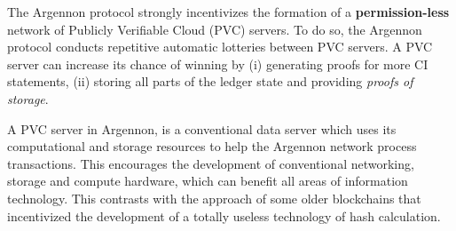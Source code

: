 The Argennon protocol strongly incentivizes the formation of a \textbf{permission-less} network of Publicly Verifiable
Cloud (PVC) servers. To do so, the Argennon protocol conducts repetitive automatic lotteries between PVC servers.
A PVC server can increase its chance of winning by (i) generating proofs for more CI statements, (ii) storing all
parts of the ledger state and providing \emph{proofs of storage}.

A PVC server in Argennon, is a conventional data server which uses its computational and
storage resources to help the Argennon network process transactions. This encourages the development
of conventional networking, storage and compute hardware, which can benefit all areas of information technology.
This contrasts with the approach of some older blockchains that incentivized the development of a totally
useless technology of hash calculation.
